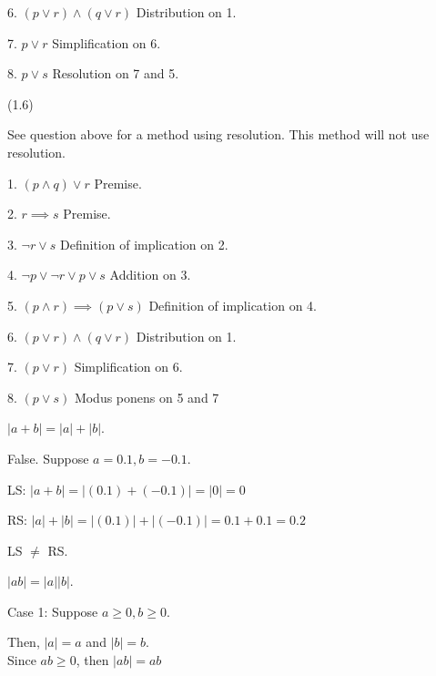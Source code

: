 \documentclass{exam}
\begin{document}
\begin{questions}
\begin{center}
6. \( (p \lor r) \land (q \lor r) \) Distribution on 1.

7. \( p \lor r \) Simplification on 6.

8. \( p \lor s \) Resolution on 7 and 5.

\end{center}

 (1.6)

\begin{center}
See question above for a method using resolution. This method will not use resolution.

1. \( (p \land q) \lor r\) Premise.

2. \( r \implies s\) Premise.

3. \( \neg r \lor s \) Definition of implication on 2.

4. \( \neg p \lor \neg r \lor p \lor s \) Addition on 3.

5. \( (p \land r) \implies (p \lor s) \) Definition of implication on 4.

6. \( (p \lor r) \land (q \lor r) \) Distribution on 1.

7. \( (p \lor r) \) Simplification on 6.

8. \( (p \lor s) \) Modus ponens on 5 and 7

\end{center}

\begin{subparts}
\subpart \( |a + b| = |a| + |b| \).

\begin{center}

False. Suppose \(a = 0.1, b = -0.1\).

LS: \( |a+b| = |(0.1)+(-0.1)| = |0| = 0 \)

RS: \( |a|+|b| = |(0.1)|+|(-0.1)| = 0.1 + 0.1 = 0.2 \)

LS \(\neq\) RS.

\end{center}

\newpage

\subpart \( |ab| = |a||b| \).

\begin{center}

Case 1: Suppose \(a \geq 0, b \geq 0 \).

Then, \(|a| = a\) and \(|b| = b\).\\
Since \( ab \geq 0 \), then \( |ab| = ab \)


\end{center}
\end{subparts}
\end{questions}
\end{document}
